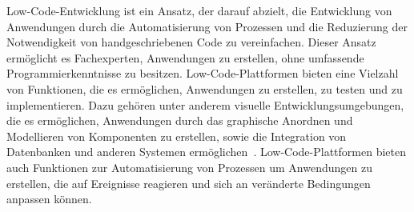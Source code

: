 
Low-Code-Entwicklung ist ein Ansatz, der darauf abzielt, die Entwicklung von Anwendungen 
durch die Automatisierung von Prozessen und die Reduzierung der Notwendigkeit von 
handgeschriebenen Code zu vereinfachen. Dieser Ansatz ermöglicht es Fachexperten, Anwendungen 
zu erstellen, ohne umfassende Programmierkenntnisse zu besitzen. Low-Code-Plattformen 
bieten eine Vielzahl von Funktionen, die es ermöglichen, Anwendungen zu erstellen, zu 
testen und zu implementieren. Dazu gehören unter anderem visuelle Entwicklungsumgebungen, 
die es ermöglichen, Anwendungen durch das graphische Anordnen und Modellieren von Komponenten zu erstellen, 
sowie die Integration von Datenbanken und anderen Systemen ermöglichen~\cite{Bock_2021}. 
Low-Code-Plattformen bieten auch Funktionen zur Automatisierung von Prozessen um Anwendungen zu 
erstellen, die auf Ereignisse reagieren und sich an veränderte Bedingungen anpassen können.

